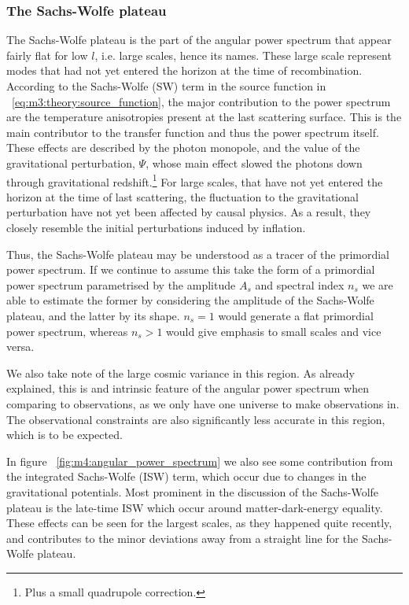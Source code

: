     \subsubsection{The Sachs-Wolfe plateau}
        The Sachs-Wolfe plateau is the part of the angular power spectrum that appear fairly flat for low $l$, i.e. large scales, hence its names. These large scale represent modes that had not yet entered the horizon at the time of recombination. According to the Sachs-Wolfe (SW) term in the source function in ~\cref{eq:m3:theory:source_function}, the major contribution to the power spectrum are the temperature anisotropies present at the last scattering surface. This is the main contributor to the transfer function and thus the power spectrum itself. These effects are described by the photon monopole, and the value of the gravitational perturbation, $\Psi$, whose main effect slowed the photons down through gravitational redshift.\footnote{Plus a small quadrupole correction.} For large scales, that have not yet entered the horizon at the time of last scattering, the fluctuation to the gravitational perturbation have not yet been affected by causal physics. As a result, they closely resemble the initial perturbations induced by inflation. 

        Thus, the Sachs-Wolfe plateau may be understood as a tracer of the primordial power spectrum. If we continue to assume this take the form of a primordial power spectrum parametrised by the amplitude $A_s$ and spectral index $n_s$ we are able to estimate the former by considering the amplitude of the Sachs-Wolfe plateau, and the latter by its shape. $n_s=1$ would generate a flat primordial power spectrum, whereas $n_s>1$ would give emphasis to small scales and vice versa. 

        We also take note of the large cosmic variance in this region. As already explained, this is and intrinsic feature of the angular power spectrum when comparing to observations, as we only have one universe to make observations in. The observational constraints are also significantly less accurate in this region, which is to be expected. 
        
        In figure ~\cref{fig:m4:angular_power_spectrum} we also see some contribution from the integrated Sachs-Wolfe (ISW) term, which occur due to changes in the gravitational potentials. Most prominent in the discussion of the Sachs-Wolfe plateau is the late-time ISW which occur around matter-dark-energy equality. These effects can be seen for the largest scales, as they happened quite recently, and contributes to the minor deviations away from a straight line for the Sachs-Wolfe plateau.
        

